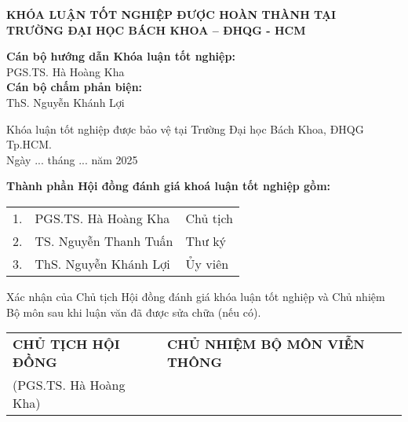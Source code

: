 
\begin{center}
    \textbf{\large KHÓA LUẬN TỐT NGHIỆP ĐƯỢC HOÀN THÀNH TẠI}\\[0.6cm]
    \textbf{\large TRƯỜNG ĐẠI HỌC BÁCH KHOA – ĐHQG - HCM}
\end{center}

\vspace{1cm}

\noindent
\textbf{Cán bộ hướng dẫn Khóa luận tốt nghiệp:}\\[0.25cm]
\hspace*{1cm}PGS.TS. Hà Hoàng Kha\\[0.8cm]

\noindent
\textbf{Cán bộ chấm phản biện:}\\[0.25cm]
\hspace*{1cm}ThS. Nguyễn Khánh Lợi\\[1cm]

\vspace{0.4cm}

\noindent
Khóa luận tốt nghiệp được bảo vệ tại Trường Đại học Bách Khoa, ĐHQG Tp.HCM.\\[0.3cm]
\hfill Ngày ... tháng ... năm 2025

\vspace{1cm}

\noindent
\textbf{Thành phần Hội đồng đánh giá khoá luận tốt nghiệp gồm:}\\[0.4cm]

\begin{center}
\begin{tabular}{p{0.5cm}p{7cm}p{4cm}}
1. & PGS.TS. Hà Hoàng Kha & Chủ tịch\\[0.3cm]
2. & TS. Nguyễn Thanh Tuấn & Thư ký\\[0.3cm]
3. & ThS. Nguyễn Khánh Lợi & Ủy viên\\
\end{tabular}
\end{center}

\vspace{1cm}

\noindent
Xác nhận của Chủ tịch Hội đồng đánh giá khóa luận tốt nghiệp và Chủ nhiệm Bộ môn sau khi luận văn đã được sửa chữa (nếu có).\\[0.8cm]

\begin{center}
\begin{tabular}{p{6cm}p{6cm}}
\centering \textbf{CHỦ TỊCH HỘI ĐỒNG} & \centering \textbf{CHỦ NHIỆM BỘ MÔN VIỄN THÔNG}\\[2cm]
\centering (PGS.TS. Hà Hoàng Kha) & \\
\end{tabular}
\end{center}

